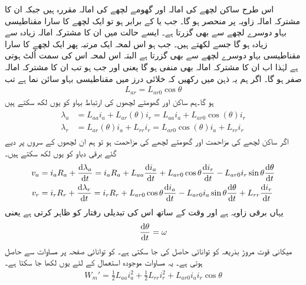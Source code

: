 اس طرح ساکن لچھے کی امالہ  اور گھومے لچھے کی امالہ  مقررہ ہیں جبکہ ان کا مشترکہ امالہ  زاویہ  پر منحصر ہو گا۔ جب  یا   کے برابر ہو تو ایک لچھے کا سارا مقناطیسی بہاو دوسرے لچھے سے بھی گزرتا ہے۔ ایسے حالت میں ان کا مشترکہ امالہ زیادہ سے زیادہ ہو گا جسے  لکھتے ہیں۔ جب   ہو اس لمحہ ایک مرتبہ پھر ایک لچھے کا سارا مقناطیسی بہاو دوسرے لچھے سے بھی گزرتا ہے البتہ اس لمحہ اس کی سمت اُلٹ ہوتی ہے لہٰذا اب ان کا مشترکہ امالہ بھی منفی ہو گا یعنی  اور جب  ہو  تب ان کا مشترکہ امالہ صفر ہو گا۔ اگر ہم یہ ذہن میں رکھیں کہ خلائی درز میں  مقناطیسی بہاو سائن نما ہے تب
\begin{align}
L_{ar}=L_{ar0} \cos \theta
\end{align}
ہو گا۔ہم ساکن اور گھومتے لچھوں کی ارتباط بہاو کو یوں لکھ سکتے ہیں
\begin{gather}
\begin{aligned}
\lambda_a&=L_{aa} i_a+L_{ar}(\theta) i_r=L_{aa} i_a+L_{ar0} \cos (\theta) i_r\\
\lambda_r&=L_{ar}(\theta) i_a+L_{rr} i_r=L_{ar0} \cos (\theta) i_a+L_{rr} i_r
\end{aligned}
\end{gather}
اگر ساکن لچھے کی مزاحمت  اور گھومتے لچھے کی مزاحمت  ہو تو ہم ان لچھوں کے سروں پر دیے گئے برقی دباو کو یوں لکھ سکتے ہیں۔
\begin{gather}
\begin{aligned}
v_a&=i_a R_a +\frac{\dif \lambda_a}{\dif t}=i_a R_a+L_{aa} \frac{\dif i_a}{\dif t}+L_{ar0} \cos \theta \frac{\dif i_r}{\dif t}-L_{ar0}  i_r \sin \theta  \frac{\dif \theta}{\dif t}\\
v_r&=i_r R_r +\frac{\dif \lambda_r}{\dif t}=i_r R_r+L_{ar0} \cos \theta \frac{\dif i_a}{\dif t}-L_{ar0} i_a \sin \theta  \frac{\dif \theta}{\dif t}+L_{rr} \frac{\dif i_r}{\dif t}
\end{aligned}
\end{gather}
یہاں  برقی زاویہ ہے اور وقت کے ساتھ اس کی تبدیلی رفتار  کو ظاہر کرتی ہے یعنی
\begin{align}
\frac{\dif \theta}{\dif t}=\omega
\end{align}
میکانی قوت مروڑ بذریعہ کو توانائی حاصل کی جا سکتی ہے۔ کو توانائی صفحہ  پر مساوات   سے حاصل ہوتی ہے۔ یہ مساوات موجودہ استعمال کے لئے یوں لکھا جا سکتا ہے۔
\begin{align}
W_m'=\frac{1}{2} L_{aa} i_a^2+\frac{1}{2} L_{rr} i_r^2+L_{ar0} i_a i_r \cos \theta
\end{align}
